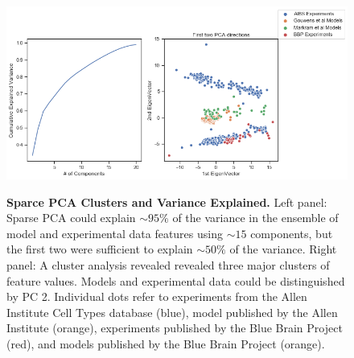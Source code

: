\begin{figure}    
\begin{center} \includegraphics[width=1.0\linewidth]{figures/cortical_model_data_agreement_52_1}
\label{fig:}
\end{center}
\caption[Sparse PCA Clusters and Variance Explained]{\textbf{Sparce PCA Clusters and Variance Explained.} Left panel: Sparse PCA could explain $\sim95\%$ of the variance in the ensemble of model and experimental data features using $\sim15$ components, but the first two were sufficient to explain $\sim50\%$ of the variance.
Right panel: A cluster analysis revealed revealed three major clusters of feature values.
Models and experimental data could be distinguished by PC 2.
Individual dots refer to experiments from the Allen Institute Cell Types database (blue), model published by the Allen Institute (orange), experiments published by the Blue Brain Project (red), and models published by the Blue Brain Project (orange).
}
\label{fig:pca_data_points}
\end{figure}    

